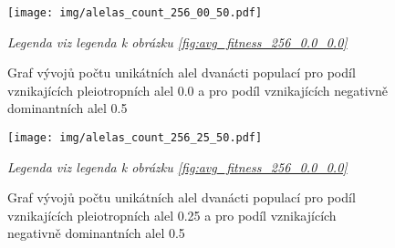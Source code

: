 \begin{figure}[H]
\caption{Graf vývojů počtu unikátních alel dvanácti populací pro podíl vznikajících pleiotropních alel 0.0 a pro podíl
    vznikajících negativně dominantních alel 0.5}
\centering
\texttt{[image: img/alelas\_count\_256\_00\_50.pdf]}

\label{fig:alelas_count_256_0.0_0.5}

\textit{Legenda viz legenda k obrázku \ref{fig:avg_fitness_256_0.0_0.0}}

\end{figure}

\begin{figure}[H]
\caption{Graf vývojů počtu unikátních alel dvanácti populací pro podíl vznikajících pleiotropních alel 0.25 a pro podíl
    vznikajících negativně dominantních alel 0.5}
\centering
\texttt{[image: img/alelas\_count\_256\_25\_50.pdf]}

\label{fig:alelas_count_256_0.25_0.5}

\textit{Legenda viz legenda k obrázku \ref{fig:avg_fitness_256_0.0_0.0}}

\end{figure}
